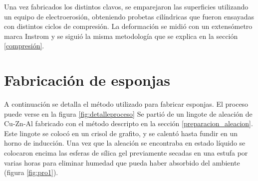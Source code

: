\documentclass[a4paper,12pt,fleqn,twoside,openany]{book}
\begin{document}
    
    Una vez fabricados los distintos clavos, se emparejaron las superficies utilizando un equipo de electroerosión, obteniendo probetas cilíndricas que fueron ensayadas con distintos ciclos de compresión. La deformación se midió con un extensómetro marca Instrom y se siguió la misma metodología que se explica en la sección \ref{compresión}.
    

\section{Fabricación de esponjas} \label{FabricacionEsponjas}

A continuación se detalla el método utilizado para fabricar esponjas. El proceso puede verse en la figura \ref{fig:detalleproceso} Se partió de un lingote de aleación de Cu-Zn-Al fabricado con el método descripto en la sección \ref{preparacion_aleacion}. Este lingote se colocó en un crisol de grafito, y se calentó hasta fundir en un horno de inducción. Una vez que la aleación se encontraba en estado líquido se colocaron encima las esferas de sílica gel previamente secadas en una estufa por varias horas para eliminar humedad que pueda haber absorbido del ambiente (figura \ref{fig:pro1}).
\end{document}
